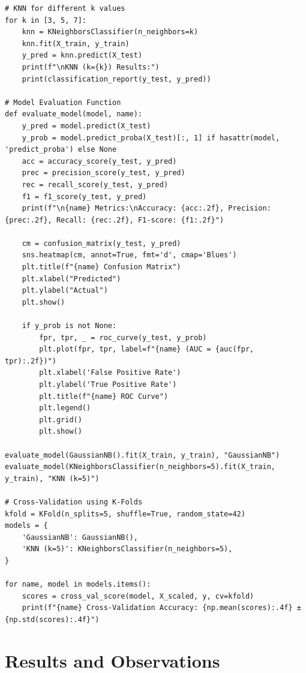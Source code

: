 \documentclass[12pt]{article}
\begin{document}
\begin{verbatim}
# KNN for different k values
for k in [3, 5, 7]:
    knn = KNeighborsClassifier(n_neighbors=k)
    knn.fit(X_train, y_train)
    y_pred = knn.predict(X_test)
    print(f"\nKNN (k={k}) Results:")
    print(classification_report(y_test, y_pred))

# Model Evaluation Function
def evaluate_model(model, name):
    y_pred = model.predict(X_test)
    y_prob = model.predict_proba(X_test)[:, 1] if hasattr(model, 'predict_proba') else None
    acc = accuracy_score(y_test, y_pred)
    prec = precision_score(y_test, y_pred)
    rec = recall_score(y_test, y_pred)
    f1 = f1_score(y_test, y_pred)
    print(f"\n{name} Metrics:\nAccuracy: {acc:.2f}, Precision: {prec:.2f}, Recall: {rec:.2f}, F1-score: {f1:.2f}")

    cm = confusion_matrix(y_test, y_pred)
    sns.heatmap(cm, annot=True, fmt='d', cmap='Blues')
    plt.title(f"{name} Confusion Matrix")
    plt.xlabel("Predicted")
    plt.ylabel("Actual")
    plt.show()

    if y_prob is not None:
        fpr, tpr, _ = roc_curve(y_test, y_prob)
        plt.plot(fpr, tpr, label=f"{name} (AUC = {auc(fpr, tpr):.2f})")
        plt.xlabel('False Positive Rate')
        plt.ylabel('True Positive Rate')
        plt.title(f"{name} ROC Curve")
        plt.legend()
        plt.grid()
        plt.show()

evaluate_model(GaussianNB().fit(X_train, y_train), "GaussianNB")
evaluate_model(KNeighborsClassifier(n_neighbors=5).fit(X_train, y_train), "KNN (k=5)")

# Cross-Validation using K-Folds
kfold = KFold(n_splits=5, shuffle=True, random_state=42)
models = {
    'GaussianNB': GaussianNB(),
    'KNN (k=5)': KNeighborsClassifier(n_neighbors=5),
}

for name, model in models.items():
    scores = cross_val_score(model, X_scaled, y, cv=kfold)
    print(f"{name} Cross-Validation Accuracy: {np.mean(scores):.4f} ± {np.std(scores):.4f}")
\end{verbatim}

\section*{Results and Observations}
\end{document}
